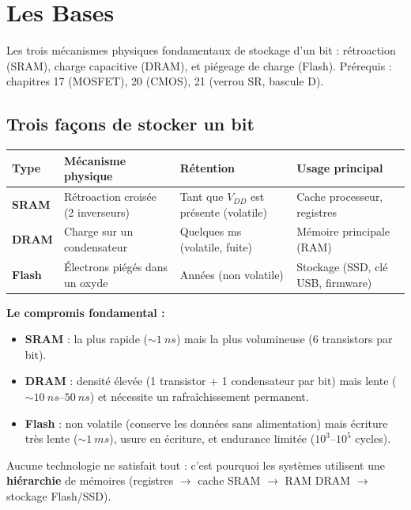 \documentclass[12pt,a4paper,twoside]{book}
\begin{document}
\section{Les Bases}

\begin{bases}
Les trois mécanismes physiques fondamentaux de stockage d'un bit : rétroaction (SRAM), charge capacitive (DRAM), et piégeage de charge (Flash). Prérequis : chapitres 17 (MOSFET), 20 (CMOS), 21 (verrou SR, bascule D).
\end{bases}

\subsection{Trois façons de stocker un bit}

\begin{formule}
\begin{center}
\renewcommand{\arraystretch}{1.5}
\begin{tabular}{p{2cm}p{3.5cm}p{3cm}p{4cm}}
\toprule
\textbf{Type} & \textbf{Mécanisme physique} & \textbf{Rétention} & \textbf{Usage principal} \\
\midrule
\textbf{SRAM} & Rétroaction croisée (2 inverseurs) & Tant que $V_{DD}$ est présente (volatile) & Cache processeur, registres \\
\textbf{DRAM} & Charge sur un condensateur & Quelques ms (volatile, fuite) & Mémoire principale (RAM) \\
\textbf{Flash} & Électrons piégés dans un oxyde & Années (non volatile) & Stockage (SSD, clé USB, firmware) \\
\bottomrule
\end{tabular}
\end{center}
\end{formule}

\begin{intuition}
\textbf{Le compromis fondamental :}
\begin{itemize}[nosep]
\item \textbf{SRAM} : la plus rapide ($\sim\SI{1}{ns}$) mais la plus volumineuse (6 transistors par bit).
\item \textbf{DRAM} : densité élevée (1 transistor + 1 condensateur par bit) mais lente ($\sim\SI{10}{ns}$--$\SI{50}{ns}$) et nécessite un rafraîchissement permanent.
\item \textbf{Flash} : non volatile (conserve les données sans alimentation) mais écriture très lente ($\sim\SI{1}{ms}$), usure en écriture, et endurance limitée ($10^3$--$10^5$ cycles).
\end{itemize}
Aucune technologie ne satisfait tout : c'est pourquoi les systèmes utilisent une \textbf{hiérarchie} de mémoires (registres $\to$ cache SRAM $\to$ RAM DRAM $\to$ stockage Flash/SSD).
\end{intuition}
\end{document}

